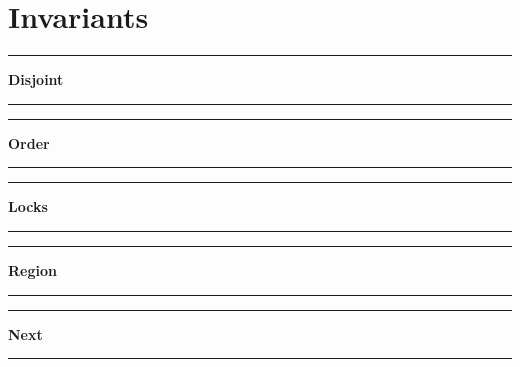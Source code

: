 





\chapter{Invariants}

\label{appendix::inv:full}

\begin{center}\rule{4cm}{0.4pt}  \textbf{Disjoint}  \rule{4cm}{0.4pt}\end{center}
\label{inv::full:disjoint}
\small{}

\normalsize{}


\begin{center}\rule{4cm}{0.4pt}  \textbf{Order}  \rule{4cm}{0.4pt}\end{center}
\label{inv::full:order}
\small{}

\normalsize{}


\begin{center}\rule{4cm}{0.4pt}  \textbf{Locks}  \rule{4cm}{0.4pt}\end{center}
\label{inv::full:lock}
\small{}

\normalsize{}


\begin{center}\rule{4cm}{0.4pt}  \textbf{Region}  \rule{4cm}{0.4pt}\end{center}
\label{inv::full:region}
\small{}

\normalsize{}


\begin{center}\rule{4cm}{0.4pt}  \textbf{Next}  \rule{4cm}{0.4pt}\end{center}
\label{inv::full:next}
\small{}

\normalsize{}


